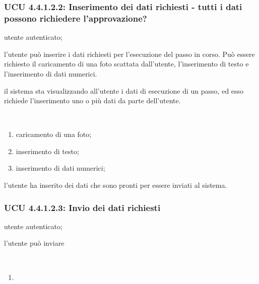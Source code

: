 \subsubsection{UCU 4.4.1.2.2: Inserimento dei dati richiesti - tutti i dati possono richiedere l'approvazione?}
\begin{description}[leftmargin=0cm]
\item[Attori:] utente autenticato;
\item[Descrizione:] l'utente può inserire i dati richiesti per l'esecuzione del passo in corso. Può essere richiesto il caricamento di una foto scattata dall'utente, l'inserimento di testo e l'inserimento di dati numerici.
\item[Precondizione:] il sistema sta visualizzando all'utente i dati di esecuzione di un passo, ed esso richiede l'inserimento uno o più dati da parte dell'utente.
\item[Scenario principale:]\
\begin{enumerate}
\item caricamento di una foto;
\item inserimento di testo;
\item inserimento di dati numerici;
\end{enumerate}
\item[Postcondizione:] l'utente ha inserito dei dati che sono pronti per essere inviati al sistema.
\end{description}

\subsubsection{UCU 4.4.1.2.3: Invio dei dati richiesti}
\begin{description}[leftmargin=0cm]
\item[Attori:] utente autenticato;
\item[Descrizione:] l'utente può inviare 
\item[Precondizione:]
\item[Scenario principale:]\
\begin{enumerate}
\item
\end{enumerate}
\item[Postcondizione:]
\end{description}

